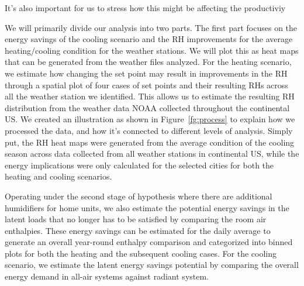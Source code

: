 It's also important for us to stress how this might be affecting the productiviy 

We will primarily divide our analysis into two parts. The first part focuses on the energy savings of the cooling scenario and the RH improvements for the average heating/cooling condition for the weather stations. We will plot this as heat maps that can be generated from the weather files analyzed. 
For the heating scenario, we estimate how changing the set point may result in improvements in the RH through a spatial plot of four cases of set points and their resulting RHs across all the weather station we identified. This allows us to estimate the resulting RH distribution from the weather data NOAA collected throughout the continental US. We created an illustration as shown in Figure~\ref{fg:process} to explain how we processed the data, and how it's connected to different levels of analysis. Simply put, the RH heat maps were generated from the average condition of the cooling season across data collected from all weather stations in continental US, while the energy implications were only calculated for the selected cities for both the heating and cooling scenarios. %

Operating under the second stage of hypothesis where there are additional humidifiers for home units, we also estimate the potential energy savings in the latent loads that no longer has to be satisfied by comparing the room air enthalpies. These energy savings can be estimated for the daily average to generate an overall year-round enthalpy comparison and categorized into binned plots for both the heating and the subsequent cooling cases. 
For the cooling scenario, we estimate the latent energy savings potential by comparing the overall energy demand in all-air systems against radiant system. 

